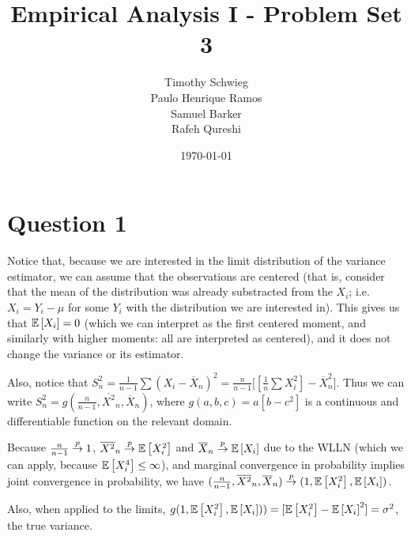 \documentclass[12pt]{paper}
\begin{document}
\author{
{Timothy Schwieg}\\
{Paulo Henrique Ramos}\\
{Samuel Barker}\\
{Rafeh Qureshi}
}

\date{\today}
\title{Empirical Analysis I -  Problem Set 3}


\maketitle

\section*{Question 1}

Notice that, because we are interested in the limit distribution of the variance estimator, we can assume that the observations are centered (that is, consider that the mean of the distribution was already substracted from the $X_i$; i.e. $X_i=Y_i-\mu$ for some $Y_i$ with the distribution we are interested in). This gives us that $\mathbb{E} \left [ X_i \right ]=0$ (which we can interpret as the first centered moment, and similarly with higher moments: all are interpreted as centered), and it does not change the variance or its estimator.

Also, notice that $S_n^2=\frac{1}{n-1}\sum{(X_i-\overline{X}_n)^2}=\frac{n}{n-1}\Big[[\frac{1}{n}\sum{X_i^2}]-\overline{X}_n^2\Big]$. Thus we can write $S_n^2=g(\frac{n}{n-1},\overline{X^2}_n,\overline{X}_n)$, where $g(a,b,c)=a[b-c^2]$ is a continuous and differentiable function on the relevant domain.

 Because $\frac{n}{n-1}\overset{p}{\to} 1$, $\overline{X^2}_n\overset{p}{\to} \mathbb{E} \left [ X_i^2 \right ]$ and $\overline{X}_n\overset{p}{\to} \mathbb{E} \left [ X_i \right ]$ due to the WLLN (which we can apply, because $\mathbb{E} \left [ X_i^4 \right ]\le \infty$), and marginal convergence in probability implies joint convergence in probability, we have $(\frac{n}{n-1},\overline{X^2}_n,\overline{X}_n)\overset{p}{\to} (1,\mathbb{E} \left [ X_i^2 \right ],\mathbb{E} \left [ X_i \right ])$.
 
 Also, when applied to the limits, $g(1,\mathbb{E} \left [ X_i^2 \right ],\mathbb{E} \left [ X_i \right ]))=[\mathbb{E} \left [ X_i^2 \right ]-\mathbb{E} \left [ X_i \right ]^2]=\sigma^2$, the true variance.
 
\end{document}
